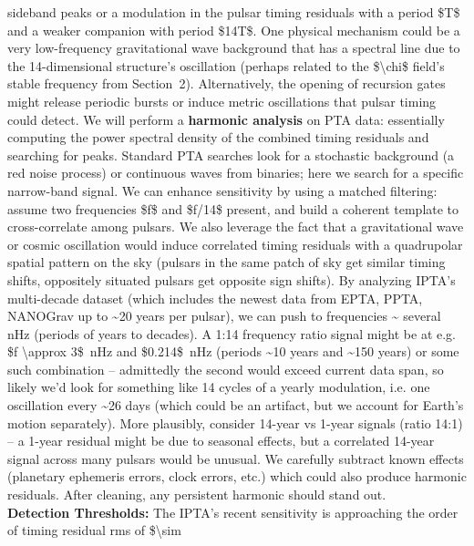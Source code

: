 \documentclass[]{article}
\begin{document}
\begin{enumerate}
  sideband peaks or a modulation in the pulsar timing residuals with a
  period \$T\$ and a weaker companion with period \$14T\$. One physical
  mechanism could be a very low-frequency gravitational wave background
  that has a spectral line due to the 14-dimensional structure's
  oscillation (perhaps related to the \$\textbackslash{}chi\$ field's
  stable frequency from Section~2). Alternatively, the opening of
  recursion gates might release periodic bursts or induce metric
  oscillations that pulsar timing could detect. We will perform a
  \textbf{harmonic analysis} on PTA data: essentially computing the
  power spectral density of the combined timing residuals and searching
  for peaks. Standard PTA searches look for a stochastic background (a
  red noise process) or continuous waves from binaries; here we search
  for a specific narrow-band signal. We can enhance sensitivity by using
  a matched filtering: assume two frequencies \$f\$ and \$f/14\$
  present, and build a coherent template to cross-correlate among
  pulsars. We also leverage the fact that a gravitational wave or cosmic
  oscillation would induce correlated timing residuals with a
  quadrupolar spatial pattern on the sky​ (pulsars in the same patch of
  sky get similar timing shifts, oppositely situated pulsars get
  opposite sign shifts). By analyzing IPTA's multi-decade dataset (which
  includes the newest data from EPTA, PPTA, NANOGrav up to
  \textasciitilde{}20 years per pulsar), we can push to frequencies
  \textasciitilde{} several nHz (periods of years to decades). A 1:14
  frequency ratio signal might be at e.g. \$f \textbackslash{}approx
  3\$~nHz and \$0.214\$~nHz (periods \textasciitilde{}10 years and
  \textasciitilde{}150 years) or some such combination -- admittedly the
  second would exceed current data span, so likely we'd look for
  something like 14 cycles of a yearly modulation, i.e. one oscillation
  every \textasciitilde{}26 days (which could be an artifact, but we
  account for Earth's motion separately). More plausibly, consider
  14-year vs 1-year signals (ratio 14:1) -- a 1-year residual might be
  due to seasonal effects, but a correlated 14-year signal across many
  pulsars would be unusual. We carefully subtract known effects
  (planetary ephemeris errors, clock errors, etc.) which could also
  produce harmonic residuals​. After cleaning, any persistent harmonic
  should stand out.\\
  \textbf{Detection Thresholds:} The IPTA's recent sensitivity is
  approaching the order of timing residual rms of \$\textbackslash{}sim

\end{enumerate}
\end{document}
